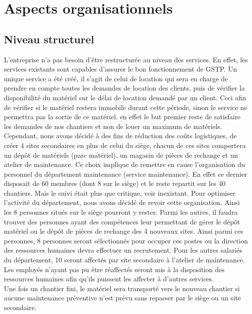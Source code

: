 \section{Aspects organisationnels}
        \subsection{Niveau structurel}
        L'entreprise n'a pas besoin d'être restructurée au niveau des services. En effet, les services existants sont capables d'assurer le bon fonctionnement de GSTP. Un unique service a été créé, il s'agit de celui de location qui sera en charge de prendre en compte toutes les demandes de location des clients, puis de vérifier la disponibilité du matériel sur le délai de location demandé par un client. Ceci afin de vérifier si le matériel restera immobile durant cette période, sinon le service ne permettra pas la sortie de ce matériel. en effet le but premier reste de satisfaire les demandes de nos chantiers et non de louer un maximum de matériels.\\
        
         Cependant, nous avons décidé à des fins de réduction des coûts logistiques, de créer 4 sites secondaires en plus de celui du siège, chacun de ces sites comportera un dépôt de matériels (parc matériel), un magasin de pièces de rechange et un atelier de maintenance. Ce choix implique de remettre en cause l'organisation du personnel du département maintenance (service maintenance). En effet ce dernier disposait de 60 membres (dont 8 sur le siège) et le reste repartit sur les 40 chantiers. Mais le suivi était plus que critique, voir inexistant. Pour optimiser l'activité du département, nous avons décidé de revoir cette organisation. Ainsi les 8 personnes situés sur le siège pourront y rester. Parmi les autres, il faudra trouver des personnes ayant des compétences leur permettant de gérer le dépôt matériel ou le dépôt de pièces de rechange des 4 nouveaux sites. Ainsi parmi ces personnes, 8 personnes seront sélectionnés pour occuper ces postes ou la direction des ressources humaines devra effectuer un recrutement. Pour les autres salariés du département,
10 seront affectés par site secondaire à l'atelier de maintenance. Les employés n'ayant pas pu être réaffectés seront mis à la disposition des ressources humaines afin qu'ils puissent les affecter à d'autres services.\\

Une fois un chantier fini, le matériel sera transporté vers le nouveau chantier si aucune maintenance préventive n'est prévu sans repasser par le siège ou un site secondaire.

